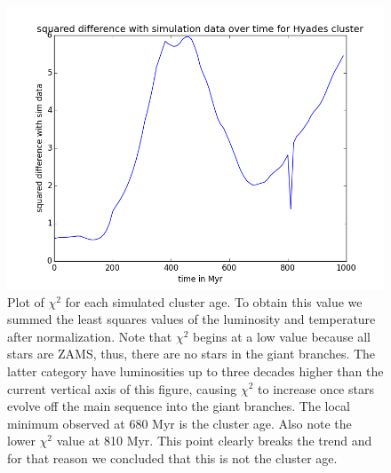 \documentclass{aa}
\begin{document}
\begin{figure}
    \centering
    \includegraphics[width=\hsize]{img/fitness_over_time.png}
    \caption{Plot of $\chi^2$ for each simulated cluster age. To obtain this value we summed the least squares values of the luminosity and temperature after normalization. Note that $\chi^2$ begins at a low value because all stars are ZAMS, thus, there are no stars in the giant branches. The latter category have luminosities up to three decades higher than the current vertical axis of this figure, causing $\chi^2$ to increase once stars evolve off the main sequence into the giant branches. The local minimum observed at 680 Myr is the cluster age. Also note the lower $\chi^2$ value at 810 Myr. This point clearly breaks the trend and for that reason we concluded that this is not the cluster age.}\label{fig:chisq}
\end{figure}
\end{document}
